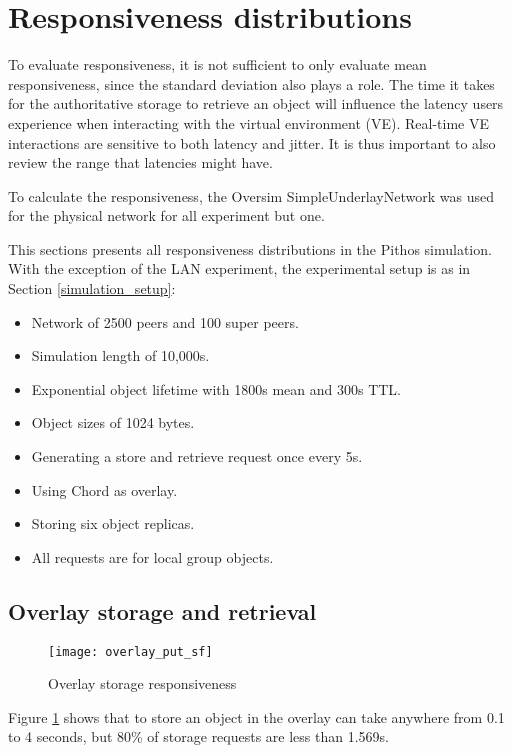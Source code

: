 \section{Responsiveness distributions}

To evaluate responsiveness, it is not sufficient to only evaluate mean responsiveness, since the standard deviation also plays a role. The time it takes for the authoritative storage to retrieve an object will influence the latency users experience when interacting with the virtual environment (VE). Real-time VE interactions are sensitive to both latency and jitter. It is thus important to also review the range that latencies might have.

To calculate the responsiveness, the Oversim SimpleUnderlayNetwork was used for the physical network for all experiment but one.

This sections presents all responsiveness distributions in the Pithos simulation. With the exception of the LAN experiment, the experimental setup is as in Section \ref{simulation_setup}:
%
\begin{itemize}
\item Network of 2500 peers and 100 super peers.
\item Simulation length of 10,000s.
\item Exponential object lifetime with 1800s mean and 300s TTL.
\item Object sizes of 1024 bytes.
\item Generating a store and retrieve request once every 5s.
\item Using Chord as overlay.
\item Storing six object replicas.
\item All requests are for local group objects.
\end{itemize}

\subsection{Overlay storage and retrieval}

\begin{figure}[htbp]
 \centering
 \texttt{[image: overlay\_put\_sf]}
 \caption{Overlay storage responsiveness}
 \label{fig_overlay_put_sf}
\end{figure}
%
Figure \ref{fig_overlay_put_sf} shows that to store an object in the overlay can take anywhere from 0.1 to 4 seconds, but 80\% of storage requests are less than 1.569s.

